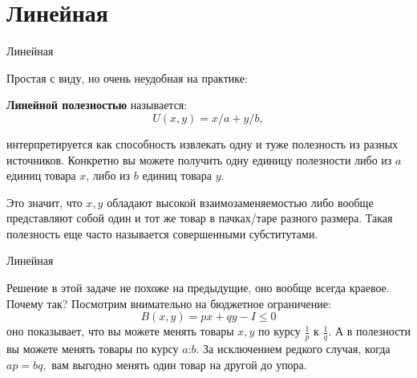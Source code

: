 \documentclass{beamer}
\begin{document}
%
%
%
%
%
%

\section{Линейная}

\begin{frame}{Линейная}

Простая с виду, но очень неудобная на практике:

\begin{definition}
\textbf{Линейной полезностью} называется:
$$U(x, y) = x/a +y/b,$$ 
\end{definition}

интерпретируется как способность извлекать одну и туже полезность из разных источников.  Конкретно вы можете получить одну единицу полезности либо из $a$ единиц товара $x$, либо из $b$ единиц товара $y$. 

Это значит, что $x, y$ обладают высокой взаимозаменяемостью либо вообще представляют собой один и тот же товар в пачках/таре разного размера. Такая полезность еще часто называется \alert{совершенными субститутами}.

\end{frame}

\begin{frame}{Линейная}

Решение в этой задаче не похоже на предыдущие, оно вообще всегда краевое. 
Почему так? Посмотрим внимательно на бюджетное ограничение:
$$B(x,y) = px + qy - I \leqslant 0$$ 
оно показывает, что вы можете менять товары $x, y$ по курсу $\frac{1}{p}$ к $\frac{1}{q}$. А в полезности вы можете менять товары по курсу $a$:$b$. За исключением редкого случая, когда $ap = bq,$ вам выгодно менять один товар на другой до упора.
\end{frame}
\end{document}
